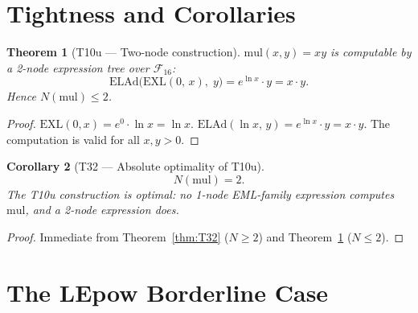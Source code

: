 \documentclass[11pt]{article}
\newtheorem{theorem}{Theorem}[section]
\newtheorem{corollary}[theorem]{Corollary}
\begin{document}
\section{Tightness and Corollaries}

\begin{theorem}[T10u --- Two-node construction]
\label{thm:T10u}
$\mathrm{mul}(x,y)=xy$ is computable by a 2-node expression tree over
$\mathcal{F}_{16}$:
\[
  \mathrm{ELAd}\!\bigl(\mathrm{EXL}(0,\, x),\; y\bigr)
  = e^{\ln x}\cdot y = x\cdot y.
\]
Hence $N(\mathrm{mul})\leq 2$.
\end{theorem}

\begin{proof}
$\mathrm{EXL}(0,x) = e^0\cdot\ln x = \ln x$.
$\mathrm{ELAd}(\ln x,\, y) = e^{\ln x}\cdot y = x\cdot y$.
The computation is valid for all $x,y>0$.
\end{proof}

\begin{corollary}[T32 --- Absolute optimality of T10u]
\label{cor:T32}
\[
  N(\mathrm{mul}) = 2.
\]
The T10u construction is optimal: no 1-node EML-family expression computes
$\mathrm{mul}$, and a 2-node expression does.
\end{corollary}

\begin{proof}
Immediate from Theorem~\ref{thm:T32} ($N\geq 2$) and Theorem~\ref{thm:T10u} ($N\leq 2$).
\end{proof}

\section{The LEpow Borderline Case}
\end{document}
